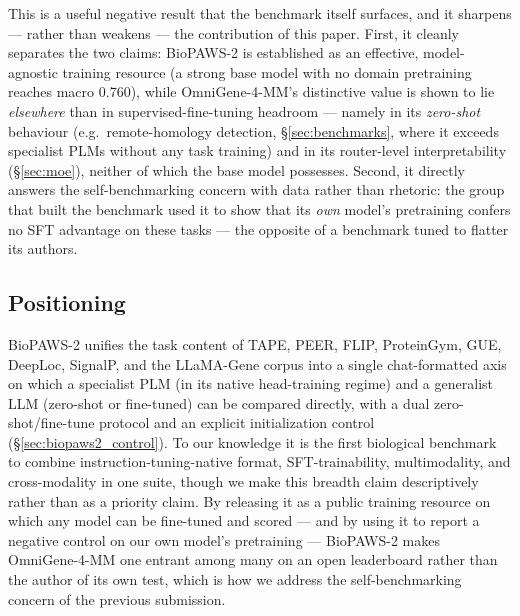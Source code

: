 This is a useful negative result that the benchmark itself surfaces, and it sharpens --- rather
than weakens --- the contribution of this paper. First, it cleanly separates the two claims:
BioPAWS-2 is established as an effective, model-agnostic training resource (a strong base
model with no domain pretraining reaches macro 0.760), while OmniGene-4-MM's distinctive
value is shown to lie \emph{elsewhere} than in supervised-fine-tuning headroom --- namely in
its \emph{zero-shot} behaviour (e.g.\ remote-homology detection, \S\ref{sec:benchmarks},
where it exceeds specialist PLMs without any task training) and in its router-level
interpretability (\S\ref{sec:moe}), neither of which the base model possesses. Second, it
directly answers the self-benchmarking concern with data rather than rhetoric: the group
that built the benchmark used it to show that its \emph{own} model's pretraining confers no
SFT advantage on these tasks --- the opposite of a benchmark tuned to flatter its authors.

\subsection{Positioning}

BioPAWS-2 unifies the task content of TAPE, PEER, FLIP, ProteinGym, GUE, DeepLoc, SignalP,
and the LLaMA-Gene corpus into a single chat-formatted axis on which a specialist PLM (in
its native head-training regime) and a generalist LLM (zero-shot or fine-tuned) can be
compared directly, with a dual zero-shot/fine-tune protocol and an explicit
initialization control (\S\ref{sec:biopaws2_control}). To our knowledge it is the first
biological benchmark to combine instruction-tuning-native format, SFT-trainability,
multimodality, and cross-modality in one suite, though we make this breadth claim
descriptively rather than as a priority claim. By releasing it as a public training
resource on which any model can be fine-tuned and scored --- and by using it to report a
negative control on our own model's pretraining --- BioPAWS-2 makes OmniGene-4-MM one
entrant among many on an open leaderboard rather than the author of its own test, which is
how we address the self-benchmarking concern of the previous submission.
